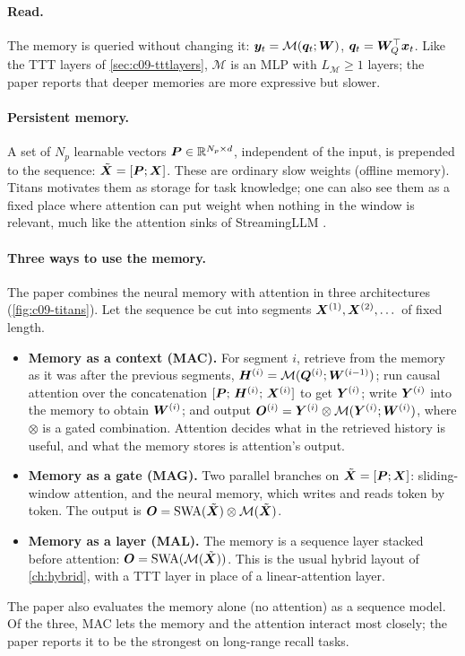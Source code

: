 \paragraph{Read.} The memory is queried without changing it:
$\bm{y}_t = \mathcal{M}(\bm{q}_t; \bm{W})$, $\bm{q}_t = \bm{W}_Q^{\top}\bm{x}_t$. Like the TTT layers of
\cref{sec:c09-tttlayers}, $\mathcal{M}$ is an MLP with $L_{\mathcal{M}} \ge 1$ layers;
the paper reports that deeper memories are more expressive but slower.

\paragraph{Persistent memory.} A set of $N_p$ learnable vectors $\bm{P}\in\mathbb{R}^{N_p\times d}$,
independent of the input, is prepended to the sequence: $\tilde{\bm{X}} = [\bm{P}; \bm{X}]$. These are
ordinary slow weights (offline memory). Titans motivates them as storage for task knowledge;
one can also see them as a fixed place where attention can put weight when nothing in the
window is relevant, much like the attention sinks of StreamingLLM \citep{xiao2023streamingllm}.

\paragraph{Three ways to use the memory.} The paper combines the neural memory with attention
in three architectures (\cref{fig:c09-titans}). Let the sequence be cut into segments
$\bm{X}^{(1)}, \bm{X}^{(2)}, \dots$ of fixed length.
\begin{itemize}
  \item \textbf{Memory as a context (MAC).} For segment $i$, retrieve from the memory as it was
        after the previous segments, $\bm{H}^{(i)} = \mathcal{M}(\bm{Q}^{(i)}; \bm{W}^{(i-1)})$; run
        causal attention over the concatenation $[\bm{P};\, \bm{H}^{(i)};\, \bm{X}^{(i)}]$ to get
        $\bm{Y}^{(i)}$; write $\bm{Y}^{(i)}$ into the memory to obtain $\bm{W}^{(i)}$; and output
        $\bm{O}^{(i)} = \bm{Y}^{(i)} \otimes \mathcal{M}(\bm{Y}^{(i)}; \bm{W}^{(i)})$, where $\otimes$ is a
        gated combination. Attention decides what in the retrieved history is useful, and
        what the memory stores is attention's output.
  \item \textbf{Memory as a gate (MAG).} Two parallel branches on $\tilde{\bm{X}} = [\bm{P};\bm{X}]$:
        sliding-window attention, and the neural memory, which writes and reads token by
        token. The output is $\bm{O} = \operatorname{SWA}(\tilde{\bm{X}}) \otimes \mathcal{M}(\tilde{\bm{X}})$.
  \item \textbf{Memory as a layer (MAL).} The memory is a sequence layer stacked before
        attention: $\bm{O} = \operatorname{SWA}(\mathcal{M}(\tilde{\bm{X}}))$. This is the usual hybrid
        layout of \cref{ch:hybrid}, with a TTT layer in place of a linear-attention layer.
\end{itemize}
The paper also evaluates the memory alone (no attention) as a sequence model. Of the three,
MAC lets the memory and the attention interact most closely; the paper reports it to be the
strongest on long-range recall tasks.

